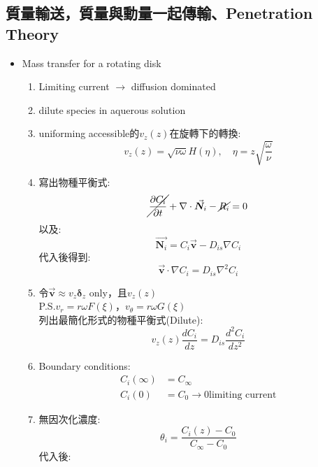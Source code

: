 \documentclass[../main.tex]{subfiles}
\begin{document}
\subsection{質量輸送，質量與動量一起傳輸、Penetration Theory}
\begin{itemize}
  \item Mass transfer for a rotating disk
  \begin{enumerate}
    \item Limiting current $\rightarrow$ diffusion dominated
    \item dilute species in aquerous solution
    \item uniforming accessible的$v_z(z)$在旋轉下的轉換:
    \begin{equation}
      v_z(z) = \sqrt{\nu\omega} H(\eta),\quad \eta = z\sqrt{\frac{\omega}{\nu}}
    \end{equation}
    \item 寫出物種平衡式:
    \begin{equation}
      \cancel{\frac{\partial C_i}{\partial t}} + \nabla \cdot \vec{\bm N_i} - \cancel{R_i} = 0
    \end{equation}
    以及:
    \begin{equation}
      \vec{\bm N_i} = C_i \vec{\bm v} - D_{is} \nabla C_i
    \end{equation}
    代入後得到:
    \begin{equation}
      \vec{\bm v} \cdot \nabla C_i = D_{is} \nabla^2 C_i
    \end{equation}
    \item 令$\vec{\bm v}\approx v_z {\bm\delta}_z$ only，且$v_z(z)$\\
    P.S.$v_r=r\omega F(\xi)$，$v_\theta=r\omega G(\xi)$\\
    列出最簡化形式的物種平衡式(Dilute):
    \begin{equation}
      v_z(z)\frac{d C_i}{dz} = D_{is}\frac{d^2 C_i}{dz^2}
    \end{equation}
    \item Boundary conditions:
    \begin{align}
      C_i(\infty) &= C_\infty\\
      C_i(0) &= C_0 \to 0 \text{limiting current}
    \end{align}
    \item 無因次化濃度:
    \begin{equation}
      \theta_i = \frac{C_i(z)-C_0}{C_\infty -C_0}
    \end{equation}
    代入後:
    \begin{equation}

\end{equation}
\end{enumerate}
\end{itemize}
\end{document}
